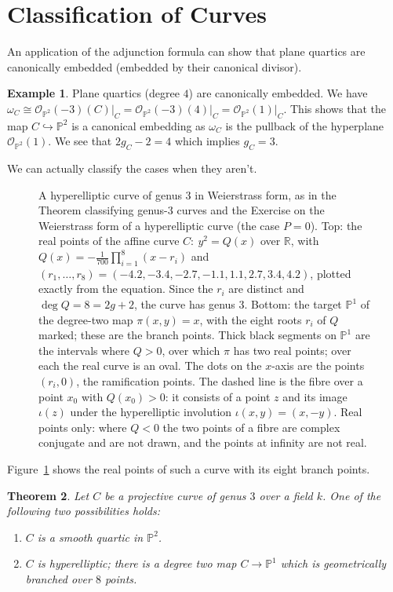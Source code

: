 \documentclass[12pt]{article}
\numberwithin{equation}{section}
\newtheorem{theorem}{Theorem}[subsection]
\theoremstyle{definition}
\newtheorem{example}[theorem]{Example}
\theoremstyle{remark}
\newcommand{\RR}{\mathbb{R}}
\newcommand{\Ocal}{\mathcal{O}}
\newcommand{\PP}{\mathbb{P}}
\begin{document}
\section{Classification of Curves}

An application of the adjunction formula can show that plane quartics are canonically embedded (embedded by their canonical divisor). 
\begin{example}
	Plane quartics (degree $4$) are canonically embedded.
	We have $\omega_C \cong \Ocal_{\PP^2}(-3)(C)\vert_C = \Ocal_{\PP^2}(-3)(4)\vert_C = \Ocal_{\PP^2}(1)\vert_C$. 
	This shows that the map $C \hookrightarrow \PP^2$ is a canonical embedding as $\omega_C$ is the pullback of the hyperplane $\Ocal_{\PP^2}(1)$. 
	We see that $2g_C-2 = 4$ which implies $g_C=3$.
\end{example}
We can actually classify the cases when they aren't.
\begin{figure}[H]
\centering

\caption{A hyperelliptic curve of genus $3$ in Weierstrass form, as in the Theorem classifying genus-$3$ curves and the Exercise on the Weierstrass form of a hyperelliptic curve (the case $P=0$). Top: the real points of the affine curve $C:\ y^2=Q(x)$ over $\RR$, with $Q(x)=-\tfrac{1}{700}\prod_{i=1}^{8}(x-r_i)$ and $(r_1,\ldots,r_8)=(-4.2,-3.4,-2.7,-1.1,1.1,2.7,3.4,4.2)$, plotted exactly from the equation. Since the $r_i$ are distinct and $\deg Q=8=2g+2$, the curve has genus $3$. Bottom: the target $\PP^1$ of the degree-two map $\pi(x,y)=x$, with the eight roots $r_i$ of $Q$ marked; these are the branch points. Thick black segments on $\PP^1$ are the intervals where $Q>0$, over which $\pi$ has two real points; over each the real curve is an oval. The dots on the $x$-axis are the points $(r_i,0)$, the ramification points. The dashed line is the fibre over a point $x_0$ with $Q(x_0)>0$: it consists of a point $z$ and its image $\iota(z)$ under the hyperelliptic involution $\iota(x,y)=(x,-y)$. Real points only: where $Q<0$ the two points of a fibre are complex conjugate and are not drawn, and the points at infinity are not real.}\label{fig:hyperelliptic-genus-3}
\end{figure}
Figure~\ref{fig:hyperelliptic-genus-3} shows the real points of such a curve with its eight branch points.

\begin{theorem}
	Let $C$ be a projective curve of genus $3$ over a field $k$.
	One of the following two possibilities holds:
	\begin{enumerate}
		\item $C$ is a smooth quartic in $\PP^2$.
		\item $C$ is hyperelliptic; there is a degree two map $C\to \PP^1$ which is geometrically branched over $8$ points.
	\end{enumerate}
\end{theorem}
\end{document}
